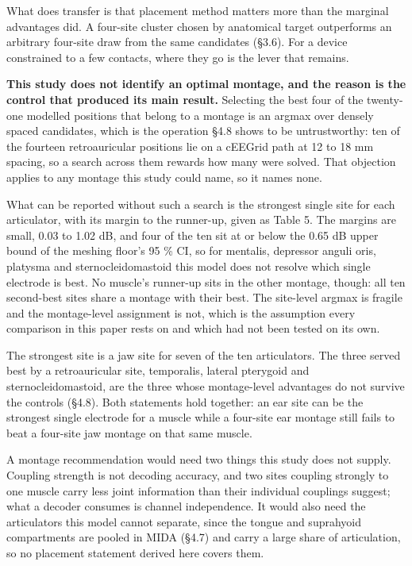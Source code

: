 \documentclass[
  11pt,
  a4paper,
]{article}
\newcounter{none} %
\begin{document}
What does transfer is that placement method matters more than the marginal
advantages did. A four-site cluster chosen by anatomical target outperforms an
arbitrary four-site draw from the same candidates (\S{}3.6). For a device
constrained to a few contacts, where they go is the lever that remains.

\textbf{This study does not identify an optimal montage, and the reason is the control
that produced its main result.} Selecting the best four of the twenty-one modelled positions that belong to a montage is an argmax over densely spaced candidates, which is the
operation \S{}4.8 shows to be untrustworthy: ten of the fourteen retroauricular
positions lie on a cEEGrid path at 12 to 18 mm spacing, so a search across them
rewards how many were solved. That objection applies to any montage this study
could name, so it names none.

What can be reported without such a search is the strongest single site for each
articulator, with its margin to the runner-up, given as Table 5. The margins are
small, 0.03 to 1.02 dB, and four of the ten sit at or below the 0.65 dB upper
bound of the meshing floor's 95 \% CI, so for mentalis, depressor anguli oris,
platysma and sternocleidomastoid this model does not resolve which single
electrode is best. No muscle's runner-up sits in the other montage, though: all
ten second-best sites share a montage with their best. The site-level argmax is
fragile and the montage-level assignment is not, which is the assumption every
comparison in this paper rests on and which had not been tested on its own.

The strongest site is a jaw site for seven of the ten articulators. The three
served best by a retroauricular site, temporalis, lateral pterygoid and
sternocleidomastoid, are the three whose montage-level advantages do not survive
the controls (\S{}4.8). Both statements hold together: an ear site can be the
strongest single electrode for a muscle while a four-site ear montage still
fails to beat a four-site jaw montage on that same muscle.

A montage recommendation would need two things this study does not supply.
Coupling strength is not decoding accuracy, and two sites coupling strongly to
one muscle carry less joint information than their individual couplings suggest;
what a decoder consumes is channel independence. It would also need the
articulators this model cannot separate, since the tongue and suprahyoid
compartments are pooled in MIDA (\S{}4.7) and carry a large share of articulation,
so no placement statement derived here covers them.
\end{document}
